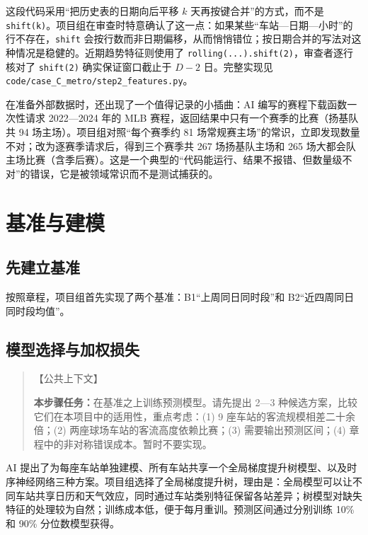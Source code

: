 这段代码采用“把历史表的日期向后平移 $k$ 天再按键合并”的方式，而不是 \texttt{shift(k)}。项目组在审查时特意确认了这一点：如果某些“车站—日期—小时”的行不存在，\texttt{shift} 会按行数而非日期偏移，从而悄悄错位；按日期合并的写法对这种情况是稳健的。近期趋势特征则使用了 \texttt{rolling(...).shift(2)}，审查者逐行核对了 \texttt{shift(2)} 确实保证窗口截止于 $D-2$ 日。完整实现见 \texttt{code/case\_C\_metro/step2\_features.py}。

在准备外部数据时，还出现了一个值得记录的小插曲：AI 编写的赛程下载函数一次性请求 2022—2024 年的 MLB 赛程，返回结果中只有一个赛季的比赛（扬基队共 94 场主场）。项目组对照“每个赛季约 81 场常规赛主场”的常识，立即发现数量不对；改为逐赛季请求后，得到三个赛季共 267 场扬基队主场和 265 场大都会队主场比赛（含季后赛）。这是一个典型的“代码能运行、结果不报错、但数量级不对”的错误，它是被领域常识而不是测试捕获的。

\section{基准与建模}

\subsection{先建立基准}

按照章程，项目组首先实现了两个基准：B1“上周同日同时段”和 B2“近四周同日同时段均值”。

\subsection{模型选择与加权损失}

\begin{quote}
【公共上下文】

\textbf{本步骤任务：}在基准之上训练预测模型。请先提出 2—3 种候选方案，比较它们在本项目中的适用性，重点考虑：(1) 9 座车站的客流规模相差二十余倍；(2) 两座球场车站的客流高度依赖比赛；(3) 需要输出预测区间；(4) 章程中的非对称错误成本。暂时不要实现。
\end{quote}

AI 提出了为每座车站单独建模、所有车站共享一个全局梯度提升树模型、以及时序神经网络三种方案。项目组选择了全局梯度提升树，理由是：全局模型可以让不同车站共享日历和天气效应，同时通过车站类别特征保留各站差异；树模型对缺失特征的处理较为自然；训练成本低，便于每月重训。预测区间通过分别训练 10\% 和 90\% 分位数模型获得。

